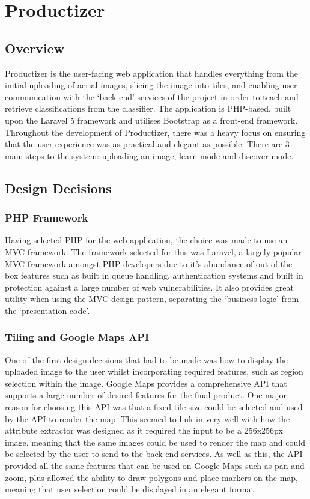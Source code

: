 \chapter{Productizer} \label{chapter:Productizer}

\section{Overview}

Productizer is the user-facing web application that handles everything from the initial uploading of aerial images, slicing the image into tiles, and enabling user communication with the ‘back-end’ services of the project in order to teach and retrieve classifications from the classifier. The application is PHP-based, built upon the Laravel 5 framework and utilises Bootstrap as a front-end framework. Throughout the development of Productizer, there was a heavy focus on ensuring that the user experience was as practical and elegant as possible. There are 3 main steps to the system: uploading an image, learn mode and discover mode.

\section{Design Decisions}

\subsection{PHP Framework}

Having selected PHP for the web application, the choice was made to use an MVC framework. The framework selected for this was Laravel, a largely popular MVC framework amongst PHP developers due to it’s abundance of out-of-the-box features such as built in queue handling, authentication systems and built in protection against a large number of web vulnerabilities. It also provides great utility when using the MVC design pattern, separating the ‘business logic’ from the ‘presentation code’. 

\subsection{Tiling and Google Maps API}
One of the first design decisions that had to be made was how to display the uploaded image to the user whilst incorporating required features, such as region selection within the image. Google Maps provides a comprehensive API that supports a large number of desired features for the final product. One major reason for choosing this API was that a fixed tile size could be selected and used by the API to render the map. This seemed to link in very well with how the attribute extractor was designed as it required the input to be a 256x256px image, meaning that the same images could be used to render the map and could be selected by the user to send to the back-end services. As well as this, the API provided all the same features that can be used on Google Maps such as pan and zoom, plus allowed the ability to draw polygons and place markers on the map, meaning that user selection could be displayed in an elegant format.


